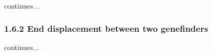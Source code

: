 \documentclass[table,
12pt, %
a4paper, %
oneside, %
headinclude,footinclude, %
BCOR5mm, %
]{scrartcl}
\begin{document}
\begin{table}[htbp]
\begin{adjustbox}{width=\textwidth,center}
\begin{tabular}{|lcclccccc|}
      \hline
    \end{tabular}
    \label{table:undet2}
  \end{adjustbox}
\end{table}

continues...\\


\subsubsection{1.6.2 End displacement between two genefinders}
continues...\\
\end{document}
